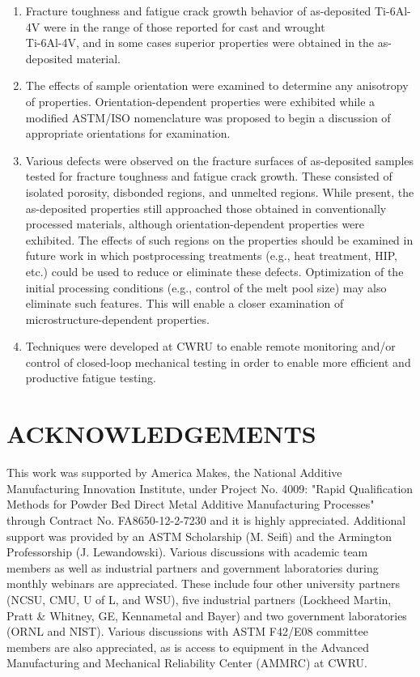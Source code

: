 \documentclass[10pt]{article}
\begin{document}
\begin{enumerate}
  \item Fracture toughness and fatigue crack growth behavior of as-deposited Ti-6Al-4V were in the range of those reported for cast and wrought\\
Ti-6Al-4V, and in some cases superior properties were obtained in the as-deposited material.

  \item The effects of sample orientation were examined to determine any anisotropy of properties. Orientation-dependent properties were exhibited while a modified ASTM/ISO nomenclature was proposed to begin a discussion of appropriate orientations for examination.

  \item Various defects were observed on the fracture surfaces of as-deposited samples tested for fracture toughness and fatigue crack growth. These consisted of isolated porosity, disbonded regions, and unmelted regions. While present, the as-deposited properties still approached those obtained in conventionally processed materials, although orientation-dependent properties were exhibited. The effects of such regions on the properties should be examined in future work in which postprocessing treatments (e.g., heat treatment, HIP, etc.) could be used to reduce or eliminate these defects. Optimization of the initial processing conditions (e.g., control of the melt pool size) may also eliminate such features. This will enable a closer examination of microstructure-dependent properties.

  \item Techniques were developed at CWRU to enable remote monitoring and/or control of closed-loop mechanical testing in order to enable more efficient and productive fatigue testing.

\end{enumerate}

\section*{ACKNOWLEDGEMENTS}
This work was supported by America Makes, the National Additive Manufacturing Innovation Institute, under Project No. 4009: "Rapid Qualification Methods for Powder Bed Direct Metal Additive Manufacturing Processes" through Contract No. FA8650-12-2-7230 and it is highly appreciated. Additional support was provided by an ASTM Scholarship (M. Seifi) and the Armington Professorship (J. Lewandowski). Various discussions with academic team members as well as industrial partners and government laboratories during monthly webinars are appreciated. These include four other university partners (NCSU, CMU, U of L, and WSU), five industrial partners (Lockheed Martin, Pratt \& Whitney, GE, Kennametal and Bayer) and two government laboratories (ORNL and NIST). Various discussions with ASTM F42/E08 committee members are also appreciated, as is access to equipment in the Advanced Manufacturing and Mechanical Reliability Center (AMMRC) at CWRU.
\end{document}

